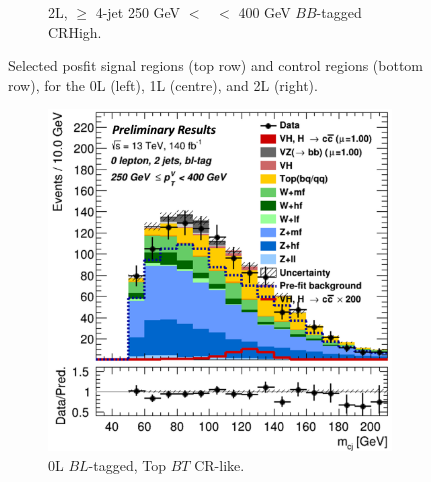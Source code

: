 \begin{figure}[h!]
\begin{subfigure}[b]{0.32\textwidth}
        \caption{2L, $\geq$ 4-jet 250 GeV $<$ \ptv\ $<$ 400 GeV $BB$-tagged CRHigh.}
        \label{fig:posfit_2L_CR}
    \end{subfigure}
    \caption{Selected posfit signal regions (top row) and control regions (bottom row), for the 0L (left), 1L (centre), and 2L (right).}
    \label{fig:postfit_SR_CR}
\end{figure} 

\begin{figure}[h!]
    \centering
    \begin{subfigure}[b]{0.32\textwidth}
        \centering
        \includegraphics[width=\textwidth]{Images/VH/Fit/fromSlides/Postfit/0LtopCRBL.png}
        \caption{0L $BL$-tagged, Top $BT$ CR-like.}
        \label{fig:val_BLtopCR}
    \end{subfigure}
    \begin{subfigure}[b]{0.32\textwidth}
        \centering

\end{subfigure}
\end{figure}

